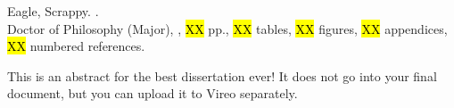 \documentclass[12pt, openany]{amsbook}
\begin{document}

Eagle, Scrappy. \emph{\DissTitleAbstract}. \\
Doctor of Philosophy (Major), \CRDate, \hl{XX} pp., \hl{XX} tables, \hl{XX} figures, \hl{XX} appendices, \hl{XX} numbered references.

This is an abstract for the best dissertation ever!
It does not go into your final document, but you can upload it to Vireo separately.
\end{document}
